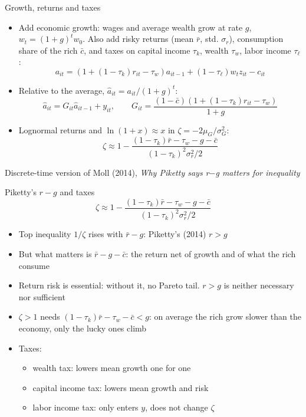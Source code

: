 \documentclass[10pt,english,10pt]{beamer}
\begin{document}
\begin{frame}{Growth, returns and taxes}
\begin{itemize}
\item Add economic growth: wages and average wealth grow at rate $g$, $w_{t}=(1+g)^{t}w_{0}$. Also add risky returns (mean $\bar{r}$, std. $\sigma_{r}$), consumption share of the rich $\bar{c}$, and taxes on capital income $\tau_{k}$, wealth $\tau_{w}$, labor income $\tau_{\ell}$:
\[
a_{it}=\left(1+(1-\tau_{k})r_{it}-\tau_{w}\right)a_{it-1}+(1-\tau_{\ell})w_{t}z_{it}-c_{it}
\]
\item Relative to the average, $\hat{a}_{it}=a_{it}/(1+g)^{t}$:
\[
\hat{a}_{it}=G_{it}\hat{a}_{it-1}+y_{it},\qquad G_{it}=\frac{(1-\bar{c})\left(1+(1-\tau_{k})r_{it}-\tau_{w}\right)}{1+g}
\]
\item Lognormal returns and $\ln(1+x)\approx x$ in $\zeta=-2\mu_{G}/\sigma_{G}^{2}$:
\[
\zeta\approx1-\frac{(1-\tau_{k})\bar{r}-\tau_{w}-g-\bar{c}}{(1-\tau_{k})^{2}\sigma_{r}^{2}/2}
\]
\end{itemize}
{\footnotesize Discrete-time version of Moll (2014), \emph{Why Piketty says r$-$g matters for inequality}}
\end{frame}

\begin{frame}{Piketty's $r-g$ and taxes}
\[
\zeta\approx1-\frac{(1-\tau_{k})\bar{r}-\tau_{w}-g-\bar{c}}{(1-\tau_{k})^{2}\sigma_{r}^{2}/2}
\]
\begin{itemize}
\item Top inequality $1/\zeta$ rises with $\bar{r}-g$: Piketty's (2014) $r>g$
\item But what matters is $\bar{r}-g-\bar{c}$: the return net of growth and of what the rich consume
\item Return risk is essential: without it, no Pareto tail. $r>g$ is neither necessary nor sufficient
\item $\zeta>1$ needs $(1-\tau_{k})\bar{r}-\tau_{w}-\bar{c}<g$: on average the rich grow slower than the economy, only the lucky ones climb
\item Taxes:
\begin{itemize}
\item wealth tax: lowers mean growth one for one
\item capital income tax: lowers mean growth and risk
\item labor income tax: only enters $y$, does not change $\zeta$
\end{itemize}
\end{itemize}
\end{frame}
\end{document}
